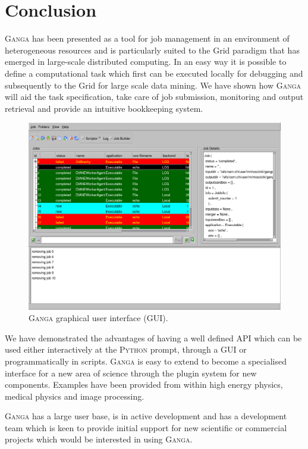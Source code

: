 \documentclass{elsart}
\def\ganga {\textsc{Ganga}\xspace}
\def\python {\textsc{Python}\xspace}
\def\grid {Grid\xspace}
\begin{document}
\section{Conclusion}
\label{sec:conclusion}
\ganga has been presented as a tool for job management in an environment of heterogeneous resources
and is particularly suited to the Grid paradigm that has emerged in large-scale distributed computing.
In an easy way it is possible to define a
computational task which first can be executed locally for debugging and
subsequently to the \grid for large scale data mining. We have shown how \ganga
will aid the task specification, take care of job submission, monitoring and
output retrieval and provide an intuitive bookkeeping system.

\begin{figure}[h!]
  \centering
  \includegraphics[width=1 \textwidth]{ganga-GUI.png}
  \caption{\ganga graphical user interface (GUI). }
  \label{fig:GUI}
\end{figure}

We have demonstrated the advantages of having a well defined API which can be
used either interactively at the \python prompt, through a GUI or
programmatically in scripts. \ganga is easy to extend to become a specialised
interface for a new area of science through the plugin system for new
components. Examples have been provided  from within high
energy physics, medical physics and image processing.

\ganga has a large user base, is in active development and has a development
team which is keen to provide initial support for new scientific or commercial
projects which would be interested in using \ganga.
\end{document}
